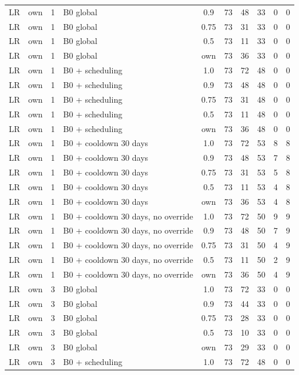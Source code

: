 \begin{longtable}{lllp{4.4cm}cccccc}
LR & own & 1 & B0 global & 0.9 & 73 & 48 & 33 & 0 & 0 \\
LR & own & 1 & B0 global & 0.75 & 73 & 31 & 33 & 0 & 0 \\
LR & own & 1 & B0 global & 0.5 & 73 & 11 & 33 & 0 & 0 \\
LR & own & 1 & B0 global & own & 73 & 36 & 33 & 0 & 0 \\
LR & own & 1 & B0 + scheduling & 1.0 & 73 & 72 & 48 & 0 & 0 \\
LR & own & 1 & B0 + scheduling & 0.9 & 73 & 48 & 48 & 0 & 0 \\
LR & own & 1 & B0 + scheduling & 0.75 & 73 & 31 & 48 & 0 & 0 \\
LR & own & 1 & B0 + scheduling & 0.5 & 73 & 11 & 48 & 0 & 0 \\
LR & own & 1 & B0 + scheduling & own & 73 & 36 & 48 & 0 & 0 \\
LR & own & 1 & B0 + cooldown 30 days & 1.0 & 73 & 72 & 53 & 8 & 8 \\
LR & own & 1 & B0 + cooldown 30 days & 0.9 & 73 & 48 & 53 & 7 & 8 \\
LR & own & 1 & B0 + cooldown 30 days & 0.75 & 73 & 31 & 53 & 5 & 8 \\
LR & own & 1 & B0 + cooldown 30 days & 0.5 & 73 & 11 & 53 & 4 & 8 \\
LR & own & 1 & B0 + cooldown 30 days & own & 73 & 36 & 53 & 4 & 8 \\
LR & own & 1 & B0 + cooldown 30 days, no override & 1.0 & 73 & 72 & 50 & 9 & 9 \\
LR & own & 1 & B0 + cooldown 30 days, no override & 0.9 & 73 & 48 & 50 & 7 & 9 \\
LR & own & 1 & B0 + cooldown 30 days, no override & 0.75 & 73 & 31 & 50 & 4 & 9 \\
LR & own & 1 & B0 + cooldown 30 days, no override & 0.5 & 73 & 11 & 50 & 2 & 9 \\
LR & own & 1 & B0 + cooldown 30 days, no override & own & 73 & 36 & 50 & 4 & 9 \\
LR & own & 3 & B0 global & 1.0 & 73 & 72 & 33 & 0 & 0 \\
LR & own & 3 & B0 global & 0.9 & 73 & 44 & 33 & 0 & 0 \\
LR & own & 3 & B0 global & 0.75 & 73 & 28 & 33 & 0 & 0 \\
LR & own & 3 & B0 global & 0.5 & 73 & 10 & 33 & 0 & 0 \\
LR & own & 3 & B0 global & own & 73 & 29 & 33 & 0 & 0 \\
LR & own & 3 & B0 + scheduling & 1.0 & 73 & 72 & 48 & 0 & 0 \\

\end{longtable}
